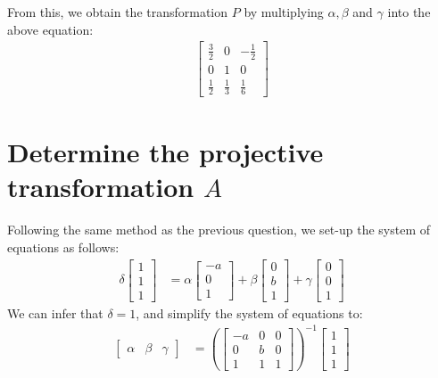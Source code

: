 \documentclass[12pt, oneside]{article}
\begin{document}
From this, we obtain the transformation $P$ by multiplying $\alpha, \beta$ and $\gamma$ into the above equation:
\begin{align*}
\begin{bmatrix}
\frac{3}{2} & 0 & -\frac{1}{2}	\\
0 & 1 & 0		\\
\frac{1}{2}  & \frac{1}{3}  & \frac{1}{6}	
\end{bmatrix}
\end{align*}

\section{Determine the projective transformation $A$}

Following the same method as the previous question, we set-up the system of equations as follows:
\begin{align*}
\delta  \begin{bmatrix}
1 		\\
1 		\\
1		
\end{bmatrix}  &= \alpha  \begin{bmatrix}
-a		\\
0 		\\
1		
\end{bmatrix} +
\beta \begin{bmatrix}
0 		\\
b 		\\
1		
\end{bmatrix} + \gamma  \begin{bmatrix}
0 		\\
0 		\\
1		
\end{bmatrix} 
\end{align*} 
We can infer that $\delta = 1$, and simplify the system of equations to:
\begin{align*}
\begin{bmatrix}
\alpha & \beta & \gamma
\end{bmatrix}  &= \left(\begin{bmatrix}
-a & 0 & 0 		\\
0 & b  & 0		\\
1 & 1  & 1	
\end{bmatrix} \right) ^{-1}
\begin{bmatrix}
1		\\
1 		\\
1		
\end{bmatrix}
\end{align*} 
\end{document}
